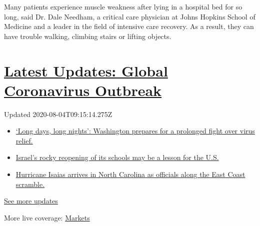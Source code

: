Many patients experience muscle weakness after lying in a hospital bed
for so long, said Dr. Dale Needham, a critical care physician at Johns
Hopkins School of Medicine and a leader in the field of intensive care
recovery. As a result, they can have trouble walking, climbing stairs or
lifting objects.

\hypertarget{latest-updates-global-coronavirus-outbreak}{%
\section{\texorpdfstring{\href{https://www.nytimes3xbfgragh.onion/2020/08/04/world/coronavirus-covid-19.html?action=click\&pgtype=Article\&state=default\&region=MAIN_CONTENT_1\&context=storylines_live_updates}{Latest
Updates: Global Coronavirus
Outbreak}}{Latest Updates: Global Coronavirus Outbreak}}\label{latest-updates-global-coronavirus-outbreak}}

Updated 2020-08-04T09:15:14.275Z

\begin{itemize}
\tightlist
\item
  \href{https://www.nytimes3xbfgragh.onion/2020/08/04/world/coronavirus-covid-19.html?action=click\&pgtype=Article\&state=default\&region=MAIN_CONTENT_1\&context=storylines_live_updates\#link-6b644638}{`Long
  days, long nights': Washington prepares for a prolonged fight over
  virus relief.}
\item
  \href{https://www.nytimes3xbfgragh.onion/2020/08/04/world/coronavirus-covid-19.html?action=click\&pgtype=Article\&state=default\&region=MAIN_CONTENT_1\&context=storylines_live_updates\#link-7af9fca0}{Israel's
  rocky reopening of its schools may be a lesson for the U.S.}
\item
  \href{https://www.nytimes3xbfgragh.onion/2020/08/04/world/coronavirus-covid-19.html?action=click\&pgtype=Article\&state=default\&region=MAIN_CONTENT_1\&context=storylines_live_updates\#link-33bf9168}{Hurricane
  Isaias arrives in North Carolina as officials along the East Coast
  scramble.}
\end{itemize}

\href{https://www.nytimes3xbfgragh.onion/2020/08/04/world/coronavirus-covid-19.html?action=click\&pgtype=Article\&state=default\&region=MAIN_CONTENT_1\&context=storylines_live_updates}{See
more updates}

More live coverage:
\href{https://www.nytimes3xbfgragh.onion/live/2020/08/03/business/stock-market-today-coronavirus?action=click\&pgtype=Article\&state=default\&region=MAIN_CONTENT_1\&context=storylines_live_updates}{Markets}

